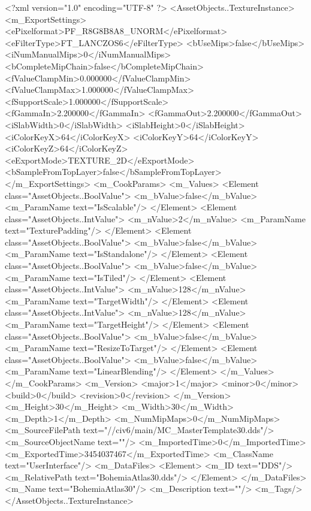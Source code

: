 <?xml version="1.0" encoding="UTF-8" ?>
<AssetObjects..TextureInstance>
	<m_ExportSettings>
		<ePixelformat>PF_R8G8B8A8_UNORM</ePixelformat>
		<eFilterType>FT_LANCZOS6</eFilterType>
		<bUseMips>false</bUseMips>
		<iNumManualMips>0</iNumManualMips>
		<bCompleteMipChain>false</bCompleteMipChain>
		<fValueClampMin>0.000000</fValueClampMin>
		<fValueClampMax>1.000000</fValueClampMax>
		<fSupportScale>1.000000</fSupportScale>
		<fGammaIn>2.200000</fGammaIn>
		<fGammaOut>2.200000</fGammaOut>
		<iSlabWidth>0</iSlabWidth>
		<iSlabHeight>0</iSlabHeight>
		<iColorKeyX>64</iColorKeyX>
		<iColorKeyY>64</iColorKeyY>
		<iColorKeyZ>64</iColorKeyZ>
		<eExportMode>TEXTURE_2D</eExportMode>
		<bSampleFromTopLayer>false</bSampleFromTopLayer>
	</m_ExportSettings>
	<m_CookParams>
		<m_Values>
			<Element class="AssetObjects..BoolValue">
				<m_bValue>false</m_bValue>
				<m_ParamName text="IsScalable"/>
			</Element>
			<Element class="AssetObjects..IntValue">
				<m_nValue>2</m_nValue>
				<m_ParamName text="TexturePadding"/>
			</Element>
			<Element class="AssetObjects..BoolValue">
				<m_bValue>false</m_bValue>
				<m_ParamName text="IsStandalone"/>
			</Element>
			<Element class="AssetObjects..BoolValue">
				<m_bValue>false</m_bValue>
				<m_ParamName text="IsTiled"/>
			</Element>
			<Element class="AssetObjects..IntValue">
				<m_nValue>128</m_nValue>
				<m_ParamName text="TargetWidth"/>
			</Element>
			<Element class="AssetObjects..IntValue">
				<m_nValue>128</m_nValue>
				<m_ParamName text="TargetHeight"/>
			</Element>
			<Element class="AssetObjects..BoolValue">
				<m_bValue>false</m_bValue>
				<m_ParamName text="ResizeToTarget"/>
			</Element>
			<Element class="AssetObjects..BoolValue">
				<m_bValue>false</m_bValue>
				<m_ParamName text="LinearBlending"/>
			</Element>
		</m_Values>
	</m_CookParams>
	<m_Version>
		<major>1</major>
		<minor>0</minor>
		<build>0</build>
		<revision>0</revision>
	</m_Version>
	<m_Height>30</m_Height>
	<m_Width>30</m_Width>
	<m_Depth>1</m_Depth>
	<m_NumMipMaps>0</m_NumMipMaps>
	<m_SourceFilePath text="//civ6/main/MC_MasterTemplate\Textures\BohemiaAtlas30.dds"/>
	<m_SourceObjectName text=""/>
	<m_ImportedTime>0</m_ImportedTime>
	<m_ExportedTime>3454037467</m_ExportedTime>
	<m_ClassName text="UserInterface"/>
	<m_DataFiles>
		<Element>
			<m_ID text="DDS"/>
			<m_RelativePath text="BohemiaAtlas30.dds"/>
		</Element>
	</m_DataFiles>
	<m_Name text="BohemiaAtlas30"/>
	<m_Description text=""/>
	<m_Tags/>
</AssetObjects..TextureInstance>

